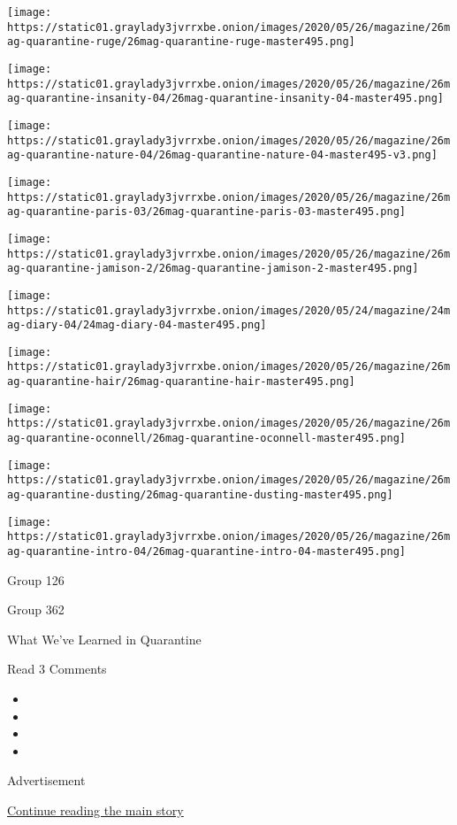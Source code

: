 \texttt{[image: https://static01.graylady3jvrrxbe.onion/images/2020/05/26/magazine/26mag-quarantine-ruge/26mag-quarantine-ruge-master495.png]}

\texttt{[image: https://static01.graylady3jvrrxbe.onion/images/2020/05/26/magazine/26mag-quarantine-insanity-04/26mag-quarantine-insanity-04-master495.png]}

\texttt{[image: https://static01.graylady3jvrrxbe.onion/images/2020/05/26/magazine/26mag-quarantine-nature-04/26mag-quarantine-nature-04-master495-v3.png]}

\texttt{[image: https://static01.graylady3jvrrxbe.onion/images/2020/05/26/magazine/26mag-quarantine-paris-03/26mag-quarantine-paris-03-master495.png]}

\texttt{[image: https://static01.graylady3jvrrxbe.onion/images/2020/05/26/magazine/26mag-quarantine-jamison-2/26mag-quarantine-jamison-2-master495.png]}

\texttt{[image: https://static01.graylady3jvrrxbe.onion/images/2020/05/24/magazine/24mag-diary-04/24mag-diary-04-master495.png]}

\texttt{[image: https://static01.graylady3jvrrxbe.onion/images/2020/05/26/magazine/26mag-quarantine-hair/26mag-quarantine-hair-master495.png]}

\texttt{[image: https://static01.graylady3jvrrxbe.onion/images/2020/05/26/magazine/26mag-quarantine-oconnell/26mag-quarantine-oconnell-master495.png]}

\texttt{[image: https://static01.graylady3jvrrxbe.onion/images/2020/05/26/magazine/26mag-quarantine-dusting/26mag-quarantine-dusting-master495.png]}

\texttt{[image: https://static01.graylady3jvrrxbe.onion/images/2020/05/26/magazine/26mag-quarantine-intro-04/26mag-quarantine-intro-04-master495.png]}

Group 126

Group 362

What We've Learned in Quarantine

Read 3 Comments

\begin{itemize}
\item
\item
\item
\item
\end{itemize}

Advertisement

\protect\hyperlink{after-bottom}{Continue reading the main story}

